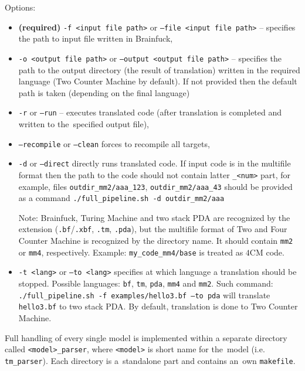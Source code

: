 \documentclass[english,shortabstract,mgr]{iithesis}
\begin{document}
Options:
\begin{itemize}
  \item\textbf{(required)} \texttt{-f <input file path>} or \texttt{--file <input file path>} -- specifies
      the path to input file written in Brainfuck,
  \item \texttt{-o <output file path>} or \texttt{--output <output file path>} -- specifies
      the path to the output directory (the result of translation) written in the required language (Two Counter Machine by default).
      If not provided then the default path is taken (depending on the final language)
  \item \texttt{-r} or \texttt{--run} -- executes translated code (after translation is completed
      and written to the~specified output file),
  \item \texttt{--recompile} or \texttt{--clean} forces to recompile all targets,
  \item \texttt{-d} or \texttt{--direct} directly runs translated code. If input
      code is in the multifile format then the path to the code should not contain latter \texttt{\_<num>}
      part, for example, files \texttt{outdir\_mm2/aaa\_123}, \texttt{outdir\_mm2/aaa\_43} should
      be provided as a command \texttt{./full\_pipeline.sh -d outdir\_mm2/aaa}

      \begin{footnotesize}
      Note: Brainfuck, Turing Machine and two stack PDA are recognized by the extension
      (\texttt{.bf}/\texttt{.xbf}, \texttt{.tm}, \texttt{.pda}), but the multifile format of Two and Four Counter Machine
      is recognized by the directory name. It should contain \texttt{mm2} or
      \texttt{mm4}, respectively. Example: \texttt{my\_code\_mm4/base} is treated as $4$CM code.
      \end{footnotesize}
  \item \texttt{-t <lang>} or \texttt{--to <lang>} specifies at which language a translation should
      be stopped. Possible languages: \texttt{bf}, \texttt{tm}, \texttt{pda}, \texttt{mm4} and \texttt{mm2}.
      Such command: \texttt{./full\_pipeline.sh -f examples/hello3.bf --to pda} will translate
      \texttt{hello3.bf} to two stack PDA. By default, translation is done to Two Counter Machine.
\end{itemize}
Full handling of every single model is implemented within a separate directory called
\texttt{<model>\_parser}, where \texttt{<model>} is short name for the~model
(i.e. \texttt{tm\_parser}). Each directory is a~standalone part and contains
an~own \texttt{makefile}.
\end{document}
